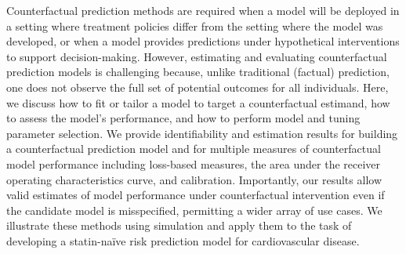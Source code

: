 


Counterfactual prediction methods are required when a model will be deployed in a setting where treatment policies differ from the setting where the model was developed, or when a model provides predictions under hypothetical interventions to support decision-making. However, estimating and evaluating counterfactual prediction models is challenging because, unlike traditional (factual) prediction, one does not observe the full set of potential outcomes for all individuals. Here, we discuss how to fit or tailor a model to target a counterfactual estimand, how to assess the model's performance, and how to perform model and tuning parameter selection. We provide identifiability and estimation results for building a counterfactual prediction model and for multiple measures of counterfactual model performance including loss-based measures, the area under the receiver operating characteristics curve, and calibration. Importantly, our results allow valid estimates of model performance under counterfactual intervention even if the candidate model is misspecified, permitting a wider array of use cases. We illustrate these methods using simulation and apply them to the task of developing a statin-na\"{i}ve risk prediction model for cardiovascular disease. \\
